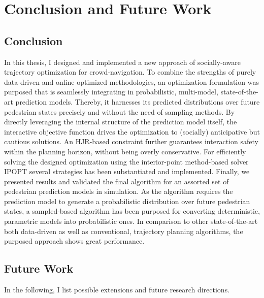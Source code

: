 \chapter{Conclusion and Future Work}
\label{text:conclusion}

\section{Conclusion}
\label{text:conclusions/conclusions}
In this thesis, I designed and implemented a new approach of socially-aware trajectory optimization for crowd-navigation. To combine the strengths of purely data-driven and online optimized methodologies, an optimization formulation was purposed that is seamlessly integrating in probabilistic, multi-model, state-of-the-art prediction models. Thereby, it harnesses its predicted distributions over future pedestrian states precisely and without the need of sampling methods.
\newline\newline
By directly leveraging the internal structure of the prediction model itself, the interactive objective function drives the optimization to (socially) anticipative but cautious solutions. An \ac{HJR}-based constraint further guarantees interaction safety within the planning horizon, without being overly conservative.
\newline\newline
For efficiently solving the designed optimization using the interior-point method-based solver \ac{IPOPT} several strategies has been substantiated and implemented.
\newline\newline
Finally, we presented results and validated the final algorithm for an assorted set of pedestrian prediction models in simulation. As the algorithm requires the prediction model to generate a probabilistic distribution over future pedestrian states, a sampled-based algorithm has been purposed for converting deterministic, parametric models into probabilistic ones. In comparison to other state-of-the-art both data-driven as well as conventional, trajectory planning algorithms, the purposed approach shows great performance.

\section{Future Work}
\label{text:conclusions/future_work}
In the following, I list possible extensions and future research directions.

